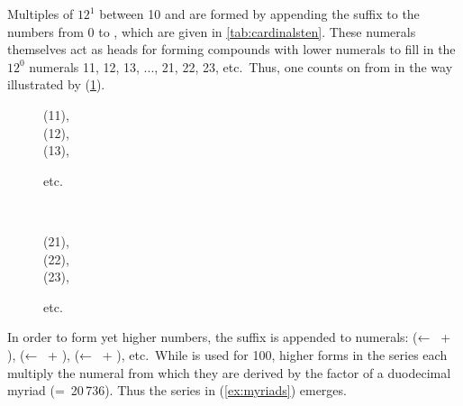 Multiples of $12^1$ between 10 and  are formed by appending the suffix
 to the numbers from 0 to \elv, which are given in
\autoref{tab:cardinalsten}. These numerals themselves act as heads for forming
compounds with lower numerals to fill in the $12^0$ numerals 11, 12, 13, ...,
21, 22, 23, etc.\ Thus, one counts on from  in
the way illustrated by (\ref{ex:counting}).

\begin{figure}[h]
\ex{}\label{ex:counting}
\begin{minipage}[t]{.5\remaining}
\tl\quad\begin{minipage}[t]{\linewidth}
	 (11), \\
	 (12), \\
	 (13), \medskip
	
	etc.
	\end{minipage}
\end{minipage}
~
\begin{minipage}[t]{.5\remaining}
\tl\quad\begin{minipage}[t]{\linewidth}
	 (21), \\
	 (22), \\
	 (23), \medskip
	
	etc.
	\end{minipage}
\end{minipage}
	
% 	
\xe
\end{figure}

In order to form yet higher numbers, the suffix  is appended
to numerals:  (←~ +
),  (←~ +
),  (←~ +
), etc.\ While  is used for 100, higher
forms in the  series each multiply the numeral from which they are
derived by the factor of a duodecimal myriad (=~20\,736). Thus the
series in (\ref{ex:myriads}) emerges.

